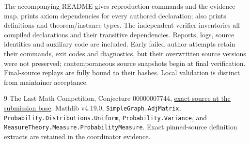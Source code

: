 \documentclass[11pt]{article}
\newcommand{\lean}[1]{\nolinkurl{#1}}
\newcommand{\code}[1]{\texttt{\detokenize{#1}}}
\begin{document}
The accompanying README gives reproduction commands and the evidence map.
\code{Audit.lean} prints axiom dependencies for every authored declaration;
\code{Check.lean} also prints definitions and theorem/instance types.
The independent verifier inventories all compiled declarations and their
transitive dependencies. Reports, logs, source identities and auxiliary code
are included. Early failed author attempts retain their commands, exit codes
and diagnostics, but their overwritten source versions were not preserved;
contemporaneous source snapshots begin at final verification. Final-source
replays are fully bound to their hashes. Local validation is distinct from
maintainer acceptance.

\begin{thebibliography}{9}
 The Last Math Competition, Conjecture 00000007744,
\href{https://github.com/The-Last-Math-Competition/The-Last-Math-Competition/blob/ba46ce0997cbf232fe95e5dced37ff4d32e1eb94/conjectures/00000007744.md}{exact source at the submission base}.
 Mathlib v4.19.0,
\lean{SimpleGraph.AdjMatrix}, \lean{Probability.Distributions.Uniform},
\lean{Probability.Variance}, and \lean{MeasureTheory.Measure.ProbabilityMeasure}.
Exact pinned-source definition extracts are retained in the coordinator evidence.
\end{thebibliography}
\end{document}
